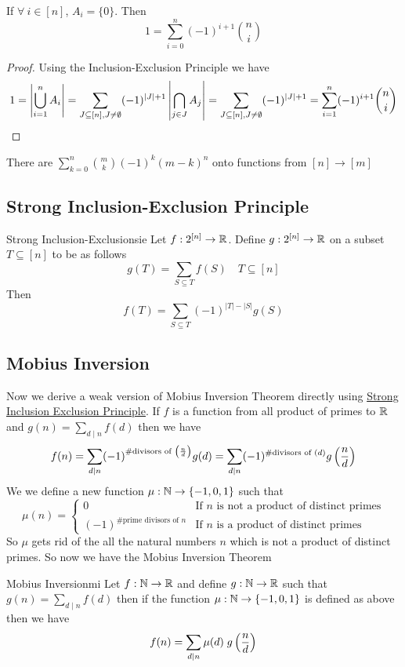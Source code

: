\documentclass[twoside]{article}
\begin{document}
\begin{corollary}{}{}
	If $\forall\ i\in[n]$, $A_i=\{0\}$. Then $$1=\sum_{i=0}^n(-1)^{i+1}\binom{n}{i}$$
\end{corollary}
\begin{proof}
	Using the Inclusion-Exclusion Principle we have $$1=\left|\bigcup_{i=1}^nA_i\right|=\sum_{J\subseteq [n], J\neq\emptyset}(-1)^{|J|+1}\left|\bigcap_{j\in J}A_j\right|=\sum_{J\subseteq [n], J\neq\emptyset}(-1)^{|J|+1}=\sum_{i=1}^n(-1)^{i+1}\binom{n}{i}$$
\end{proof}
\begin{corolary}{}{}
	There are $\sum\limits_{k=0}^n\binom{m}{k}(-1)^k(m-k)^n$ onto functions from $[n]\to [m]$
\end{corolary}
\subsection{Strong Inclusion-Exclusion Principle}
\begin{Theorem}{Strong Inclusion-Exclusion}{sie}
	Let $f:2^{[n]}\to \mathbb{R}$. Define $g:2^{[n]}\to \mathbb{R}$ on a subset $T\subseteq [n]$ to be as follows $$g(T)=\sum_{S\subseteq T}f(S)\quad T\subseteq [n]$$Then $$f(T)=\sum_{S\subseteq T}(-1)^{|T|-|S|}g(S)$$
\end{Theorem}
\subsection{Mobius Inversion}
Now we derive a weak version of Mobius Inversion Theorem directly using \hyperref[th:sie]{Strong Inclusion Exclusion Principle}. If $f$ is a function from all product of primes to $\mathbb{R}$ and $g(n)=\sum\limits_{d\mid n}f(d)$ then we have $$f(n)=\sum\limits_{d\mid n}(-1)^{\#\text{divisors of $\left(\frac{n}d\right)$}}g(d)=\sum_{d\mid n}(-1)^{\#\text{divisors of $(d)$}}g\left(\frac{n}d\right)$$We we define a new function $\mu:\mathbb{N}\to \{-1,0,1\}$  such that $$\mu(n)=\begin{cases}
	0 & \text{If $n$ is not a product of distinct primes}\\
	(-1)^{\#\text{prime divisors of $n$}} & \text{If $n$ is a product of distinct primes}
\end{cases}$$So $\mu$ gets rid of the all the natural numbers $n$ which is not a product of distinct primes. 
So now we have the Mobius Inversion Theorem
\begin{Theorem}{Mobius Inversion}{mi}
	Let $f:\mathbb{N}\to \mathbb{R}$ and define $g:\mathbb{N}\to \mathbb{R}$ such that $g(n)=\sum\limits_{d\mid n}f(d)$ then if the  function $\mu:\mathbb{N}\to \{-1,0,1\}$   is defined as above then we have $$f(n)=\sum_{d\mid n}\mu(d)\; g\left(\frac{n}d\right)$$
\end{Theorem}
\end{document}
